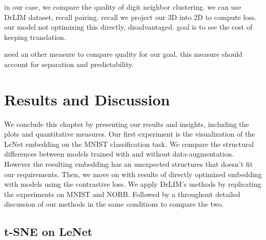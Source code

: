 \documentclass[a4paper,12pt]{report}
\begin{document}
in our case, we compare the quality of digit neighbor clustering.
we can use DrLIM dataset, recall pairing.
recall we project our 3D into 2D to compute loss.
our model not optimizing this directly, disadvantaged.
goal is to see the cost of keeping translation.

need an other measure to compare quality for our goal.
this measure should account for separation and predictability.


\section{Results and Discussion}

We conclude this chapter by presenting our results and insights, including the plots and quantitative measures.
Our first experiment is the visualization of the LeNet embedding on the MNIST classification task.
We compare the structural differences between models trained with and without data-augmentation.
However the resulting embedding has an unexpected structures that doesn't fit our requirements.
Then, we move on with results of directly optimized embedding with models using the contrastive loss.
We apply DrLIM's methods by replicating the experiments on MNIST and NORB.
Followed by a throughout detailed discussion of our methods in the same conditions to compare the two.


\subsection{t-SNE on LeNet}
\end{document}
